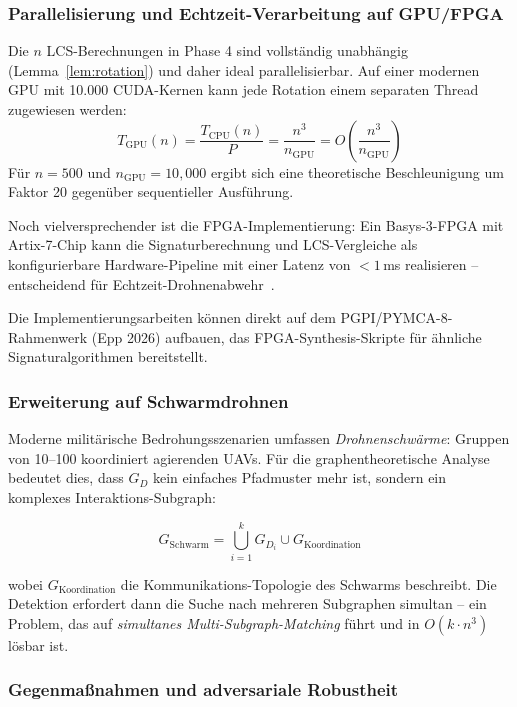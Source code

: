 ﻿\documentclass[a4paper,12pt]{article}
\theoremstyle{definition}
\begin{document}
\subsubsection{Parallelisierung und Echtzeit-Verarbeitung auf GPU/FPGA}

Die $n$ LCS-Berechnungen in Phase 4 sind vollst\"andig unabh\"angig
(Lemma~\ref{lem:rotation}) und daher ideal parallelisierbar. Auf einer
modernen GPU mit 10.000 CUDA-Kernen kann jede Rotation einem separaten
Thread zugewiesen werden:
\[
T_{\mathrm{GPU}}(n) = \frac{T_{\mathrm{CPU}}(n)}{P} = \frac{n^3}{n_{\mathrm{GPU}}} = O\!\left(\frac{n^3}{n_{\mathrm{GPU}}}\right)
\]
F\"ur $n = 500$ und $n_{\mathrm{GPU}} = 10{,}000$ ergibt sich eine
theoretische Beschleunigung um Faktor 20 gegen\"uber sequentieller Ausf\"uhrung.

Noch vielversprechender ist die FPGA-Implementierung: Ein Basys-3-FPGA
mit Artix-7-Chip kann die Signaturberechnung und LCS-Vergleiche als
konfigurierbare Hardware-Pipeline mit einer Latenz von $<1$\,ms realisieren --
entscheidend f\"ur Echtzeit-Drohnenabwehr~\cite{fpga2023}.

Die Implementierungsarbeiten k\"onnen direkt auf dem PGPI/PYMCA-8-Rahmenwerk
(Epp 2026) aufbauen, das FPGA-Synthesis-Skripte f\"ur \"ahnliche
Signaturalgorithmen bereitstellt.

\subsubsection{Erweiterung auf Schwarmdrohnen}

Moderne milit\"arische Bedrohungsszenarien umfassen \emph{Drohnenschw\"arme}:
Gruppen von 10--100 koordiniert agierenden UAVs. F\"ur die graphentheoretische
Analyse bedeutet dies, dass $G_D$ kein einfaches Pfadmuster mehr ist, sondern
ein komplexes Interaktions-Subgraph:

\[
G_{\mathrm{Schwarm}} = \bigcup_{i=1}^{k} G_{D_i} \cup G_{\mathrm{Koordination}}
\]

wobei $G_{\mathrm{Koordination}}$ die Kommunikations-Topologie des Schwarms
beschreibt. Die Detektion erfordert dann die Suche nach mehreren Subgraphen
simultan -- ein Problem, das auf \emph{simultanes Multi-Subgraph-Matching}
f\"uhrt und in $O(k \cdot n^3)$ l\"osbar ist.

\subsubsection{Gegenma\ss{}nahmen und adversariale Robustheit}
\end{document}
